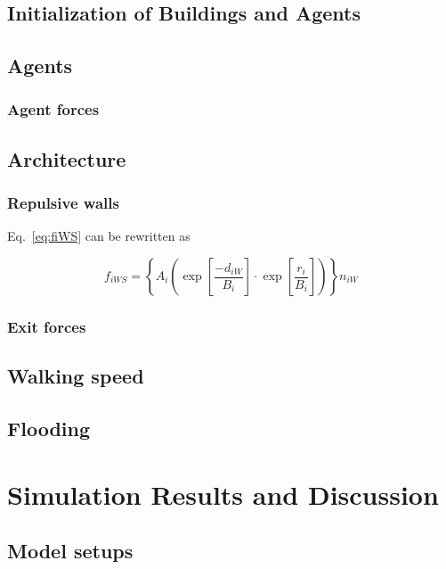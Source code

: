 \documentclass[11pt]{article}
\begin{document}
\subsection{Initialization of Buildings and Agents}

\subsection{Agents}

\subsubsection{Agent forces}

\subsection{Architecture}

\subsubsection{Repulsive walls}

Eq.~\eqref{eq:fiWS} can be rewritten as

\begin{equation}
	{f_{iWS}} = \left\{ {{A_i}\left( {\exp \left[ {\frac{{ - {d_{iW}}}}{{{B_i}}}} \right] \cdot \exp \left[ {\frac{{{r_i}}}{{{B_i}}}} \right]} \right)} \right\}{n_{iW}}
	\label{eq:fiWS2}
\end{equation}

\subsubsection{Exit forces}

\subsection{Walking speed}

\subsection{Flooding}

\section{Simulation Results and Discussion}

\subsection{Model setups}
\end{document}
